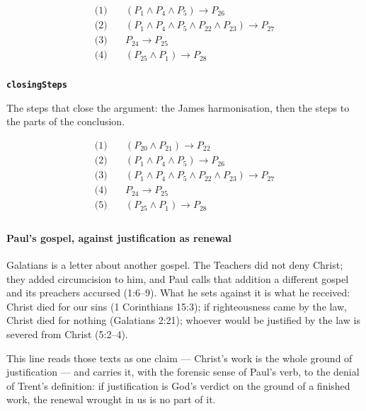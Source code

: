 \documentclass[11pt]{article}
\begin{document}
\begin{align*}
  \text{(1)} \quad & (P_{1} \land P_{4} \land P_{5}) \rightarrow P_{26} \\
  \text{(2)} \quad & (P_{1} \land P_{4} \land P_{5} \land P_{22} \land P_{23}) \rightarrow P_{27} \\
  \text{(3)} \quad & P_{24} \rightarrow P_{25} \\
  \text{(4)} \quad & (P_{25} \land P_{1}) \rightarrow P_{28} \\
\end{align*}
\par\medskip\noindent\textbf{\texttt{closing\allowbreak{}Steps}}\par\nobreak\noindent
The steps that close the argument: the James harmonisation, then the steps to the parts of the conclusion.

\begin{align*}
  \text{(1)} \quad & (P_{20} \land P_{21}) \rightarrow P_{22} \\
  \text{(2)} \quad & (P_{1} \land P_{4} \land P_{5}) \rightarrow P_{26} \\
  \text{(3)} \quad & (P_{1} \land P_{4} \land P_{5} \land P_{22} \land P_{23}) \rightarrow P_{27} \\
  \text{(4)} \quad & P_{24} \rightarrow P_{25} \\
  \text{(5)} \quad & (P_{25} \land P_{1}) \rightarrow P_{28} \\
\end{align*}
\paragraph*{Paul's gospel, against justification as renewal}
\leavevmode\par
Galatians is a letter about another gospel. The Teachers did not deny Christ; they added circumcision to him, and Paul calls that addition a different gospel and its preachers accursed (1:6–9). What he sets against it is what he received: Christ died for our sins (1 Corinthians 15:3); if righteousness came by the law, Christ died for nothing (Galatians 2:21); whoever would be justified by the law is severed from Christ (5:2–4).

This line reads those texts as one claim — Christ's work is the whole ground of justification — and carries it, with the forensic sense of Paul's verb, to the denial of Trent's definition: if justification is God's verdict on the ground of a finished work, the renewal wrought in us is no part of it.
\end{document}
